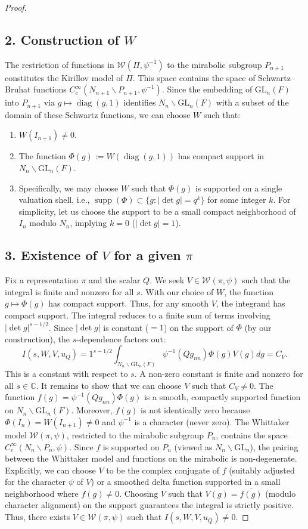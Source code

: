 \documentclass[12pt]{article}
\theoremstyle{plain}
\theoremstyle{definition}
\newcommand{\GL}{\mathrm{GL}}
\newcommand{\diag}{\operatorname{diag}}
\newcommand{\supp}{\operatorname{supp}}
\begin{document}
\begin{proof}
\subsection*{2. Construction of $W$}
The restriction of functions in $\mathcal{W}(\Pi, \psi^{-1})$ to the mirabolic subgroup $P_{n+1}$ constitutes the Kirillov model of $\Pi$. This space contains the space of Schwartz--Bruhat functions $C_c^\infty(N_{n+1} \backslash P_{n+1}, \psi^{-1})$.
Since the embedding of $\GL_n(F)$ into $P_{n+1}$ via $g \mapsto \diag(g, 1)$ identifies $N_n \backslash \GL_n(F)$ with a subset of the domain of these Schwartz functions, we can choose $W$ such that:
\begin{enumerate}
    \item $W(I_{n+1}) \neq 0$.
    \item The function $\Phi(g) := W(\diag(g, 1))$ has compact support in $N_n \backslash \GL_n(F)$.
    \item Specifically, we may choose $W$ such that $\Phi(g)$ is supported on a single valuation shell, i.e., $\supp(\Phi) \subset \{ g : |\det g| = q^k \}$ for some integer $k$. For simplicity, let us choose the support to be a small compact neighborhood of $I_n$ modulo $N_n$, implying $k=0$ ($|\det g|=1$).
\end{enumerate}

\subsection*{3. Existence of $V$ for a given $\pi$}
Fix a representation $\pi$ and the scalar $Q$. We seek $V \in \mathcal{W}(\pi, \psi)$ such that the integral is finite and nonzero for all $s$.
With our choice of $W$, the function $g \mapsto \Phi(g)$ has compact support. Thus, for any smooth $V$, the integrand has compact support. The integral reduces to a finite sum of terms involving $|\det g|^{s-1/2}$. Since $|\det g|$ is constant ($=1$) on the support of $\Phi$ (by our construction), the $s$-dependence factors out:
\[
I(s, W, V, u_Q) = 1^{s-1/2} \int_{N_n \backslash \GL_n(F)} \psi^{-1}(Q g_{nn}) \Phi(g) V(g) dg = C_V.
\]
This is a constant with respect to $s$. A non-zero constant is finite and nonzero for all $s \in \mathbb{C}$.
It remains to show that we can choose $V$ such that $C_V \neq 0$.
The function $f(g) = \psi^{-1}(Q g_{nn}) \Phi(g)$ is a smooth, compactly supported function on $N_n \backslash \GL_n(F)$. Moreover, $f(g)$ is not identically zero because $\Phi(I_n) = W(I_{n+1}) \neq 0$ and $\psi^{-1}$ is a character (never zero).
The Whittaker model $\mathcal{W}(\pi, \psi)$, restricted to the mirabolic subgroup $P_n$, contains the space $C_c^\infty(N_n \backslash P_n, \psi)$. Since $f$ is supported on $P_n$ (viewed as $N_n \backslash \GL_n$), the pairing between the Whittaker model and functions on the mirabolic is non-degenerate. Explicitly, we can choose $V$ to be the complex conjugate of $f$ (suitably adjusted for the character $\psi$ of $V$) or a smoothed delta function supported in a small neighborhood where $f(g) \neq 0$.
Choosing $V$ such that $V(g) = \overline{f(g)}$ (modulo character alignment) on the support guarantees the integral is strictly positive.
Thus, there exists $V \in \mathcal{W}(\pi, \psi)$ such that $I(s, W, V, u_Q) \neq 0$.


\end{proof}
\end{document}
